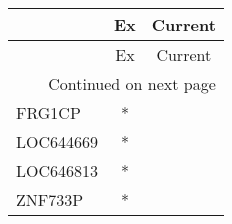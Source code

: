 \begin{longtable}{lcc}
\toprule
{} & Ex & Current \\
\midrule
\endfirsthead

\toprule
{} & Ex & Current \\
\midrule
\endhead
\midrule
\multicolumn{3}{r}{{Continued on next page}} \\
\midrule
\endfoot

\bottomrule
\endlastfoot
FRG1CP    &  * &         \\
LOC644669 &  * &         \\
LOC646813 &  * &         \\
ZNF733P   &  * &         \\
\end{longtable}

